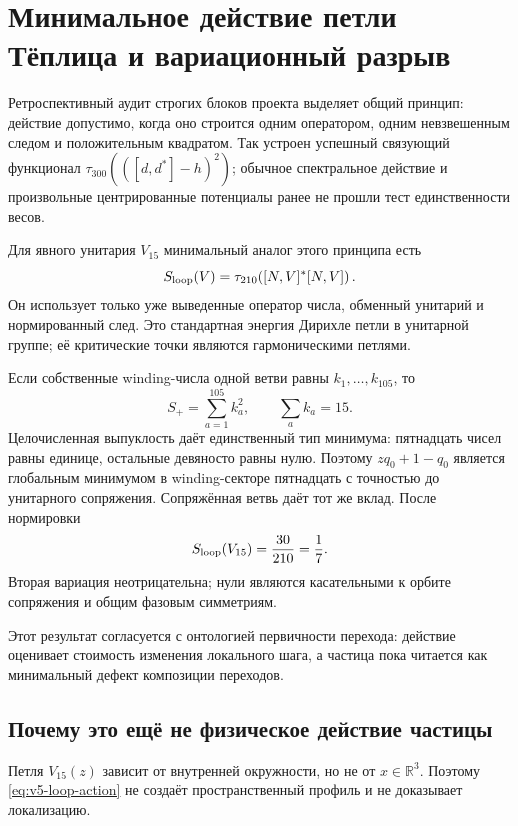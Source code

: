 \chapter{Минимальное действие петли Тёплица и вариационный разрыв}

Ретроспективный аудит строгих блоков проекта выделяет общий принцип:
действие допустимо, когда оно строится одним оператором, одним
невзвешенным следом и положительным квадратом. Так устроен успешный
связующий функционал $\tau_{300}(([d,d^*]-h)^2)$; обычное спектральное
действие и произвольные центрированные потенциалы ранее не прошли тест
единственности весов.

Для явного унитария $V_{15}$ минимальный аналог этого принципа есть
\begin{equation}
 S_{\rm loop}(V)=\tau_{210}\!\left([N,V]^*[N,V]\right).
 \label{eq:v5-loop-action}
\end{equation}
Он использует только уже выведенные оператор числа, обменный унитарий и
нормированный след. Это стандартная энергия Дирихле петли в унитарной
группе; её критические точки являются гармоническими петлями.

Если собственные winding-числа одной ветви равны $k_1,\ldots,k_{105}$,
то
\begin{equation}
 S_+=\sum_{a=1}^{105}k_a^2,
 \qquad \sum_a k_a=15.
\end{equation}
Целочисленная выпуклость даёт единственный тип минимума:
пятнадцать чисел равны единице, остальные девяносто равны нулю. Поэтому
$zq_0+1-q_0$ является глобальным минимумом в winding-секторе пятнадцать
с точностью до унитарного сопряжения. Сопряжённая ветвь даёт тот же вклад.
После нормировки
\begin{equation}
 S_{\rm loop}(V_{15})=\frac{30}{210}=\frac17.
\end{equation}
Вторая вариация неотрицательна; нули являются касательными к орбите
сопряжения и общим фазовым симметриям.

Этот результат согласуется с онтологией первичности перехода: действие
оценивает стоимость изменения локального шага, а частица пока читается
как минимальный дефект композиции переходов.

\section{Почему это ещё не физическое действие частицы}

Петля $V_{15}(z)$ зависит от внутренней окружности, но не от
$x\in\mathbb R^3$. Поэтому \eqref{eq:v5-loop-action} не создаёт
пространственный профиль и не доказывает локализацию.

